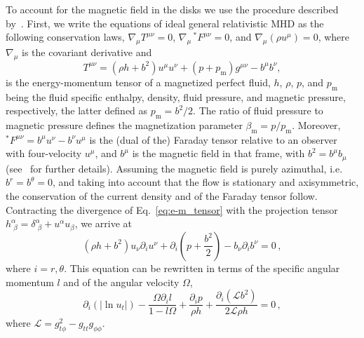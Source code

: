 \documentclass[twocolumn,aps,showpacs,showkeys,prd,superscriptaddress,byrevtex, amsmath]{revtex4-1}
\begin{document}
To account for the magnetic field in the disks we use the procedure described by~\cite{Komissarov:2006,Montero:2007}. First, we write the equations of ideal general relativistic MHD as the following conservation laws, $\nabla_{\mu} T^{\mu\nu} = 0$, $\nabla_{\mu} \,^\ast F^{\mu\nu} = 0$, and 
$\nabla_{\mu} (\rho u^{\mu}) = 0$, 
where $\nabla_{\mu}$ is the covariant derivative and
\begin{equation}\label{eq:e-m_tensor}
T^{\mu\nu} = (\rho h + b^2)u^{\mu}u^{\nu} + (p + p_{\mathrm{m}})g^{\mu\nu} - b^{\mu}b^{\nu},
\end{equation}
is the energy-momentum tensor of a magnetized perfect fluid, $h$, $\rho$, $p$, and $p_{\mathrm{m}}$ being the fluid specific enthalpy, density, fluid pressure, and magnetic pressure, respectively, the latter defined as $p_{\mathrm{m}} = b^2/2$. The ratio of fluid pressure to magnetic pressure defines the magnetization parameter $\beta_{\mathrm{m}} = p/p_{\mathrm{m}}$.
Moreover, $^\ast F^{\mu\nu} = b^{\mu}u^{\nu} - b^{\nu}u^{\mu}$ is the (dual of the) Faraday tensor relative to an observer with 
four-velocity $u^{\mu}$, and $b^{\mu}$ is the magnetic field in that frame, with
$b^2=b^{\mu}b_{\mu}$ (see~\cite{Anton:2006} for further details). Assuming the magnetic field is purely azimuthal, i.e.~$b^r = b^{\theta} = 0$,
and taking into account that the flow is stationary and axisymmetric, the conservation of the current density and of the Faraday tensor follow. Contracting the divergence of Eq.~\eqref{eq:e-m_tensor} with the projection tensor $h^{\alpha}_{\,\,\beta} = \delta^{\alpha}_{\,\,\beta} + u^{\alpha}u_{\beta}$, we arrive at
\begin{equation}
(\rho h + b^2)u_{\nu}\partial_i u^{\nu} + \partial_i\left(p + \frac{b^2}{2}\right) - b_{\nu}\partial_i b^{\nu}=0\,,
\end{equation}
where $i = r, \theta$. This equation can be rewritten in terms of the specific angular momentum $l$ and of the angular velocity $\Omega$, 
\begin{equation}\label{eq:diff_ver}
\partial_i(|\ln u_t|) - \frac{\Omega \partial_i l}{1-l\Omega} + \frac{\partial_i p}{\rho h} + \frac{\partial_i(\mathcal{L}b^2)}{2\mathcal{L}\rho h} = 0\,,
\end{equation}
where $\mathcal{L} = g_{t\phi}^2 - g_{tt}g_{\phi\phi}$.
\end{document}
